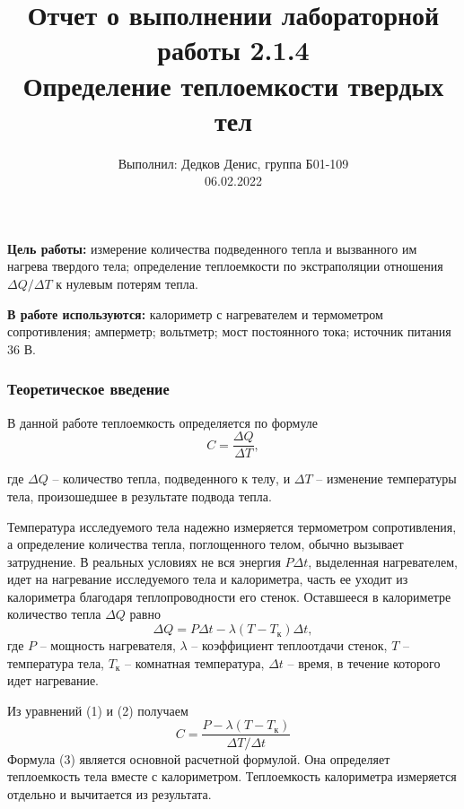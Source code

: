 \documentclass[12pt,a4paper]{article}
\title{
	\large Отчет о выполнении лабораторной работы 2.1.4 \\
	\Large Определение теплоемкости твердых тел \\ 

}
\author{\normalsize Выполнил: Дедков Денис, группа Б01-109 \\
	\normalsize 06.02.2022}
\date{}
\begin{document}
	\maketitle
	
	\textbf{Цель работы:} измерение количества подведенного тепла и вызванного им нагрева твердого тела; определение теплоемкости по экстраполяции отношения $\Delta Q / \Delta T$ к нулевым потерям тепла.
	
	\textbf{В работе используются:} калориметр с нагревателем и термометром сопротивления; амперметр; вольтметр; мост постоянного тока; источник питания 36 В.
	
	\subsubsection*{Теоретическое введение}
	
	В данной работе теплоемкость определяется по формуле
	\begin{equation}
		C = \frac{\Delta Q}{\Delta T},
		\label{eq:dQdT}
	\end{equation}
	
	где $\Delta Q$ -- количество тепла, подведенного к телу, и $\Delta T$ -- изменение температуры тела, произошедшее в результате подвода тепла.
	
	Температура исследуемого тела надежно измеряется термометром сопротивления, а определение количества тепла, поглощенного телом, обычно вызывает затруднение. В реальных условиях не вся энергия $P \Delta t$, выделенная нагревателем, идет на нагревание исследуемого тела и калориметра, часть ее уходит из калориметра благодаря теплопроводности его стенок. Оставшееся в калориметре количество тепла $\Delta Q$ равно 
	\begin{equation}
		\Delta Q = P\Delta t - \lambda(T - T_{\text{к}}) \Delta t,
		\label{eq:dQ}
	\end{equation}
	где $P$ -- мощность нагревателя, $\lambda$ -- коэффициент теплоотдачи стенок, $T$ -- температура тела, $T_{\text{к}}$ -- комнатная температура, $ \Delta t$ -- время, в течение которого идет нагревание.
	
	Из уравнений (1) и (2) получаем
	\begin{equation}
		C = \frac{P - \lambda(T - T_{\text{к}})}{\Delta T / \Delta t}
		\label{osnovnaya}
	\end{equation}
	Формула (3) является основной расчетной формулой. Она определяет теплоемкость тела вместе с калориметром. Теплоемкость калориметра измеряется отдельно и вычитается из результата.
	
\end{document}
